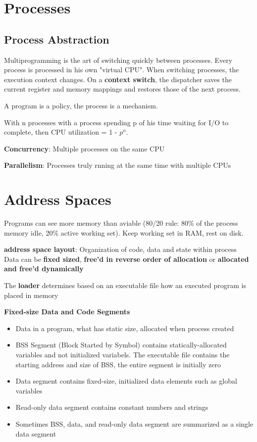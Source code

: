 \documentclass[11pt,a4paper]{article}
\begin{document}
	\section{Processes}
	
	\subsection{Process Abstraction}
	
	Multiprogramming is the art of switching quickly between processes. Every process is processed in his own "virtual CPU". When switching processes, the execution context changes. On a  \textbf{context switch}, the dispatcher saves the current register and memory mappings and restores those of the next process.
	
	A program is a policy, the process is a mechanism.
	
	With n processes with a process spending p of his time waiting for I/O to complete, then CPU utilization = 1 - ${p^n}$. \newline
	
	\textbf{Concurrency}: Multiple processes on the same CPU
	
	\textbf{Parallelism}: Processes truly rnning at the same time with multiple CPUs
	
	\section{Address Spaces}
	
	Programs can see more memory than aviable (80/20 rule: 80\% of the process memory idle, 20\% active working set). Keep working set in RAM, rest on disk.
	
	\textbf{address space layout}: Organization of code, data and state within process
	Data can be \textbf{fixed sized}, \textbf{free'd in reverse order of allocation} or \textbf{allocated and free'd dynamically}
	
	The \textbf{loader} determines based on an executable file how an executed program is placed in memory \newline
	
	\textbf{Fixed-size Data and Code Segments}
	\begin{itemize}
		\item Data in a program, what has static size, allocated when process created
		\item BSS Segment  (Block Started by Symbol) contains statically-allocated variables and not initialized variabels. The executable file contains the starting address and size of BSS, the entire segment is initially zero
		\item Data segment contains fixed-size, initialized data elements such as global variables
		\item Read-only data segment contains constant numbers and strings
		\item Sometimes BSS, data, and read-only data segment are summarized as a single data segment
	\end{itemize}
	
\end{document}
